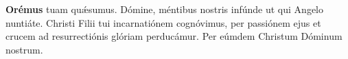\textbf{Orémus}
 tuam qu{\'\ae}sumus. Dómine, méntibus nostris infúnde ut qui Angelo nuntiáte.
Christi Filii tui incarnatiónem cognóvimus, per passiónem ejus et crucem ad resurrectiónis glóriam perducámur.
Per eúmdem Christum Dóminum nostrum.\\[1mm]
